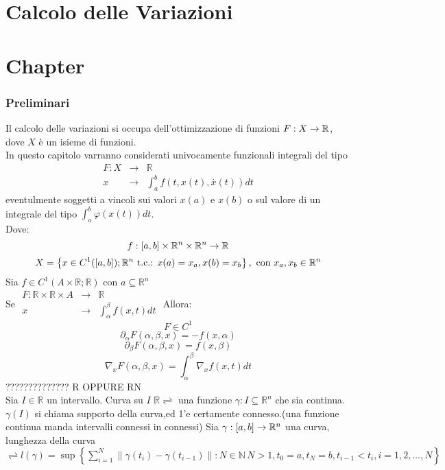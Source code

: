 \part{Calcolo delle Variazioni}
\part{Chapter}

\section{Preliminari}
Il calcolo delle variazioni si occupa dell'ottimizzazione di funzioni $F:X\to\mathbb{R}$, dove $X$ è un isieme di funzioni.\\
In questo capitolo varranno considerati univocamente funzionali integrali del tipo
$$\begin{array}{rcl} F: X & \to & \mathbb{R} \\
x & \to & \int_{a}^b f(t,x(t),\overset{\cdot}{x}(t))dt\end{array}$$
eventulmente soggetti a vincoli sui valori $x(a)$ e $x(b)$ o sul valore di un integrale del tipo $\int_a^b \varphi(x(t))dt$.\\
Dove:
$$f:\left[a,b\right]\times\mathbb{R}^n\times\mathbb{R}^n\to\mathbb{R}$$
$$X=\left\{x\in C^1(\left[a,b\right]);\mathbb{R}^n\text{ t.c.: }x(a)=x_a, x(b)=x_b \right\},\text{ con }x_a,x_b\in\mathbb{R}^n$$
\proposition
Sia $f\in C^1(A\times\mathbb{R};\mathbb{R})$ con $a\subseteq\mathbb{R}^n$\\
Se $\begin{array}{ccc} F: \mathbb{R}\times\mathbb{R}\times A & \to & \mathbb{R} \\
x & \to & \int_{\alpha}^\beta f(x,t)dt\end{array}$
Allora:
$$ F\in C^1$$
$$ \partial_\alpha F(\alpha,\beta,x)=-f(x,\alpha)$$
$$ \partial_\beta F(\alpha,\beta,x)=f(x,\beta)$$
$$ \nabla_x F(\alpha,\beta,x)=\int_{\alpha}^{\beta}\nabla_xf(x,t)dt$$
 ?????????????? R OPPURE RN\\
Sia $I\in\mathbb{R}$ un intervallo. Curva su $I$ $\mathbb{R}\rightleftharpoons$ una funzione $\gamma:I\subseteq\mathbb{R}^n$ che sia continua.
\observation
$\gamma(I)$ si chiama supporto della curva,ed 1'e certamente connesso.(una funzione continua manda intervalli connessi in connessi)
Sia $\gamma:\left[a,b\right]\to\mathbb{R}^n$ una curva, lunghezza della curva $\rightleftharpoons l(\gamma)=\sup\left\{\sum\limits_{i=1}^{N}\left\|\gamma(t_i)-\gamma(t_{i-1})\right\|: N\in\mathbb{N}\,N>1,t_0=a,t_N=b,t_{i-1}<t_i, i=1,2,\ldots,N \right\}$ 
